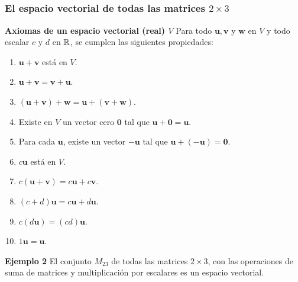 
\subsection{}

{\nologo
\begin{frame}\frametitle{El espacio vectorial de todas las matrices $2\times 3$}

\begin{block}{\textbf{Axiomas de un espacio vectorial (real) $V$}}	
	\justifying
	Para todo $\mathbf{u}, \mathbf{v}$ y $\mathbf{w}$ en $V$ y todo escalar $c$ y $d$ en $\mathbb{R}$, se 
	cumplen las siguientes propiedades: 
	
	\vspace{-3mm}
	\begin{multicols}{2}		
		\begin{enumerate}			
			\justifying
			\item $\mathbf{u}+\mathbf{v}$ está en $V$. %
			\item $\mathbf{u}+\mathbf{v} = \mathbf{v}+\mathbf{u}$. %
			\item $(\mathbf{u}+\mathbf{v})+\mathbf{w} = \mathbf{u}+(\mathbf{v}+\mathbf{w})$. %
			\item Existe en $V$ un vector cero $\mathbf{0}$ tal que $\mathbf{u}+\mathbf{0} = \mathbf{u}$.		
			\item Para cada $\mathbf{u}$, existe un vector $-\mathbf{u}$ tal que
			$ \mathbf{u}+(-\mathbf{u}) = \mathbf{0}$.
			\columnbreak
			\item $c\mathbf{u}$ está en $V$. 
			\item $c(\mathbf{u}+\mathbf{v}) = c\mathbf{u} + c\mathbf{v}$.
			\item $(c+d)\mathbf{u} = c\mathbf{u} + d\mathbf{u}$.
			\item $c(d\mathbf{u}) = (cd)\mathbf{u}$.
			\item $1\mathbf{u} = \mathbf{u}$.
		\end{enumerate}		
	\end{multicols}
	
	\vspace{-2mm}
\end{block}

\begin{ej}{\textbf{Ejemplo 2}}\justifying
	El conjunto $M_{23}$ de todas las matrices $2\times 3$, con las operaciones de suma de matrices
	y multiplicación por escalares es un espacio vectorial.
\end{ej}

\end{frame}
}

